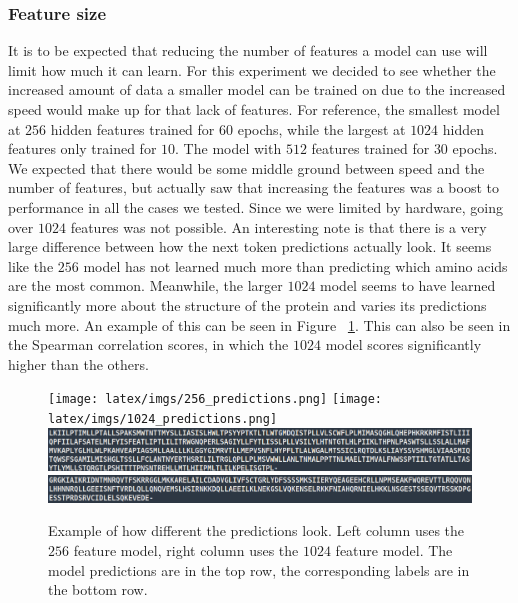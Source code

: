 \subsubsection{Feature size}
It is to be expected that reducing the number of features a model can use will limit how much it can learn. For this experiment we decided to see whether the increased amount of data a smaller model can be trained on due to the increased speed would make up for that lack of features. For reference, the smallest model at $256$ hidden features trained for $60$ epochs, while the largest at $1024$ hidden features only trained for $10$. The model with $512$ features trained for $30$ epochs. We expected that there would be some middle ground between speed and the number of features, but actually saw that increasing the features was a boost to performance in all the cases we tested. Since we were limited by hardware, going over $1024$ features was not possible. An interesting note is that there is a very large difference between how the next token predictions actually look. It seems like the $256$ model has not learned much more than predicting which amino acids are the most common. Meanwhile, the larger $1024$ model seems to have learned significantly more about the structure of the protein and varies its predictions much more. An example of this can be seen in Figure ~\ref{fig:predictions}. This can also be seen in the Spearman correlation scores, in which the $1024$ model scores significantly higher than the others. 

\begin{figure}[!ht]
  \centering
  \texttt{[image: latex/imgs/256\_predictions.png]}
  \texttt{[image: latex/imgs/1024\_predictions.png]}
  \includegraphics[width=0.49\linewidth]{latex/imgs/256_labels.png}
  \includegraphics[width=0.49\linewidth]{latex/imgs/1024_labels.png}
  \caption{Example of how different the predictions look. Left column uses the $256$ feature model, right column uses the $1024$ feature model. The model predictions are in the top row, the corresponding labels are in the bottom row.}
  \label{fig:predictions}
\end{figure}

